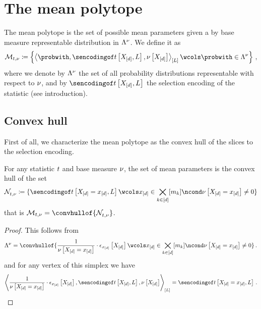 \section{The mean polytope}\label{sec:meanPolytope}

The mean polytope is the set of possible mean parameters given a by base measure representable distribution in $\Lambda^{\nu}$.
We define it as
\begin{align*}
    \genmeanset
    \coloneqq \left\{\contractionof{\probwith,\sencsstatwith,\basemeasurewith}{\selvariable}\wcols\probwith\in\distmeasuredby{\basemeasure} \right\} \, ,
\end{align*}
where we denote by $\Lambda^{\nu}$ the set of all probability distributions representable with respect to $\nu$, and by $\sencsstatwith$ the selection encoding of the statistic (see introduction).

\subsection{Convex hull}

First of all, we characterize the mean polytope as the convex hull of the slices to the selection encoding.

\begin{lemma}
    For any statistic $t$ and base measure $\nu$, the set of mean parameters is the convex hull of the set
    \begin{align*}
        \genimset
        \coloneqq \{\sencsstatat{\indexedshortcatvariables,\selvariable}
        \wcols\shortcatindices\in\facstates\ncond\basemeasureat{\indexedshortcatvariables}\neq0 \}
    \end{align*}
    that is $\genmeanset = \convhullof{\genimset}$.
\end{lemma}
\begin{proof}
    This follows from
    \begin{align*}
        \distmeasuredby{\basemeasure}
        = \convhullof{
            \frac{1}{\basemeasureat{\indexedshortcatvariables}} \cdot \onehotmapofat{\shortcatindices}{\shortcatvariables}
            \wcols\shortcatindices\in\facstates\ncond\basemeasureat{\indexedshortcatvariables}\neq0} \, .
    \end{align*}
    and for any vertex of this simplex we have
    \begin{align*}
        \contractionof{\frac{1}{\basemeasureat{\indexedshortcatvariables}} \cdot \onehotmapofat{\shortcatindices}{\shortcatvariables},\sencsstatwith,\basemeasurewith}{\selvariable}
        = \sencsstatat{\indexedshortcatvariables,\selvariable} \, .
    \end{align*}
\end{proof}

